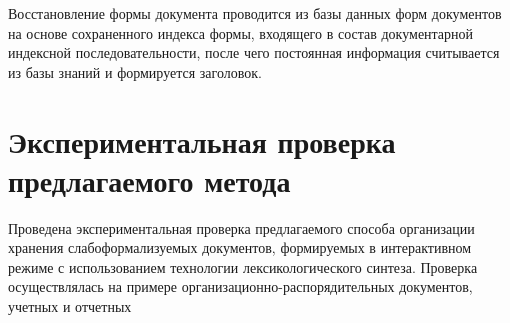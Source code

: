 \begin{multicols}{2}
     Восстановление формы документа проводится из базы данных форм 
документов на основе сохраненного индекса формы, входящего в состав 
документарной индексной последовательности, после чего постоянная 
информация считывается из базы знаний и формируется заголовок.

\section{Экспериментальная проверка предлагаемого метода}

     Проведена экспериментальная проверка предлагаемого способа 
организации хранения сла\-бо\-фор\-ма\-ли\-зу\-емых документов, формируемых в 
интерактивном режиме с использованием технологии лексикологического 
синтеза. Проверка осуществлялась на примере организационно-распорядительных 
документов, учетных и отчетных\linebreak\vspace*{-12pt}
\pagebreak

\end{multicols}


